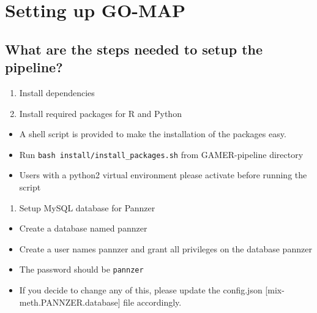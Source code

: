 \section{Setting up GO-MAP}
\subsection{What are the steps needed to setup the pipeline?}\label{what-are-the-steps-needed-to-setup-the-pipeline}

\begin{enumerate}
 \def\labelenumi{\arabic{enumi}.}

 \item
       Install dependencies
 \item
       Install required packages for R and Python
\end{enumerate}

\begin{itemize}

 \item
       A shell script is provided to make the installation of the packages
       easy.
 \item
       Run \texttt{bash\ install/install\_packages.sh} from GAMER-pipeline
       directory
 \item
       Users with a python2 virtual environment please activate before
       running the script
\end{itemize}

\begin{enumerate}
 \def\labelenumi{\arabic{enumi}.}
 \setcounter{enumi}{2}

 \item
       Setup MySQL database for Pannzer
\end{enumerate}

\begin{itemize}

 \item
       Create a database named pannzer
 \item
       Create a user names pannzer and grant all privileges on the database
       pannzer
 \item
       The password should be \texttt{pannzer}
 \item
       If you decide to change any of this, please update the config.json
       {[}mix-meth.PANNZER.database{]} file accordingly.
\end{itemize}
